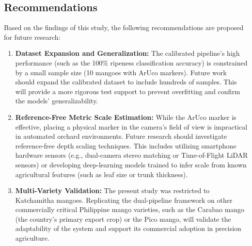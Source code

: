 \subsection{Recommendations}
Based on the findings of this study, the following recommendations are proposed for future research:
\begin{enumerate}
    \item \textbf{Dataset Expansion and Generalization:} The calibrated pipeline's high
    performance (such as the 100\% ripeness classification accuracy) is constrained by a small
    sample size (10 mangoes with ArUco markers). Future work should expand the calibrated
    dataset to include hundreds of samples. This will provide a more rigorous test support to prevent
    overfitting and confirm the models' generalizability.
    \item \textbf{Reference-Free Metric Scale Estimation:} While the ArUco marker is effective,
    placing a physical marker in the camera's field of view is impractical in automated orchard
    environments. Future research should investigate reference-free depth scaling techniques. This
    includes utilizing smartphone hardware sensors (e.g., dual-camera stereo matching or Time-of-Flight
    LiDAR sensors) or developing deep-learning models trained to infer scale from known agricultural
    features (such as leaf size or trunk thickness).
    \item \textbf{Multi-Variety Validation:} The present study was restricted to Katchamitha
    mangoes. Replicating the dual-pipeline framework on other commercially critical Philippine mango
    varieties, such as the Carabao mango (the country's primary export crop) or the Pico mango,
    will validate the adaptability of the system and support its commercial adoption in precision
    agriculture.
\end{enumerate}
